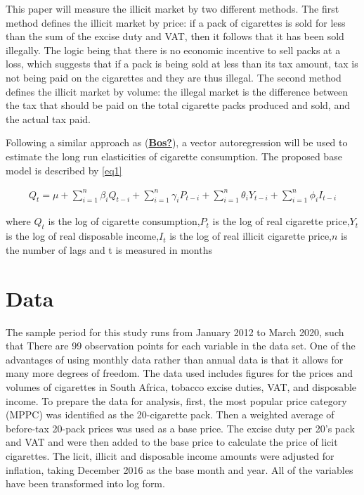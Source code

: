 \documentclass[11pt,preprint, authoryear]{elsarticle}
\numberwithin{equation}{section}
\numberwithin{figure}{section}
\numberwithin{table}{section}
\begin{document}
This paper will measure the illicit market by two different methods. The
first method defines the illicit market by price: if a pack of
cigarettes is sold for less than the sum of the excise duty and VAT,
then it follows that it has been sold illegally. The logic being that
there is no economic incentive to sell packs at a loss, which suggests
that if a pack is being sold at less than its tax amount, tax is not
being paid on the cigarettes and they are thus illegal. The second
method defines the illicit market by volume: the illegal market is the
difference between the tax that should be paid on the total cigarette
packs produced and sold, and the actual tax paid.

Following a similar approach as
(\protect\hyperlink{ref-Bos}{\textbf{Bos?}}), a vector autoregression
will be used to estimate the long run elasticities of cigarette
consumption. The proposed base model is described by \ref{eq1}

\begin{align}
 Q_t = \mu + \sum_{i = 1}^{n}\beta_iQ_{t-i} +\sum_{i = 1}^{n}\gamma_iP_{t-i} + \sum_{i = 1}^{n}\theta_iY_{t-i} + \sum_{i = 1}^{n}\phi_iI_{t-i} \label{eq1}
\end{align}

where \(Q_t\) is the log of cigarette consumption,\newline \(P_{t}\) is
the log of real cigarette price,\newline \(Y_{t}\) is the log of real
disposable income,\newline \(I_{t}\) is the log of real illicit
cigarette price,\newline \(n\) is the number of lags and t is measured
in months

\hypertarget{data}{%
\section{\texorpdfstring{Data \label{dat}}{Data }}\label{data}}

The sample period for this study runs from January 2012 to March 2020,
such that There are 99 observation points for each variable in the data
set. One of the advantages of using monthly data rather than annual data
is that it allows for many more degrees of freedom. The data used
includes figures for the prices and volumes of cigarettes in South
Africa, tobacco excise duties, VAT, and disposable income. To prepare
the data for analysis, first, the most popular price category (MPPC) was
identified as the 20-cigarette pack. Then a weighted average of
before-tax 20-pack prices was used as a base price. The excise duty per
20's pack and VAT and were then added to the base price to calculate the
price of licit cigarettes. The licit, illicit and disposable income
amounts were adjusted for inflation, taking December 2016 as the base
month and year. All of the variables have been transformed into log
form.
\end{document}
